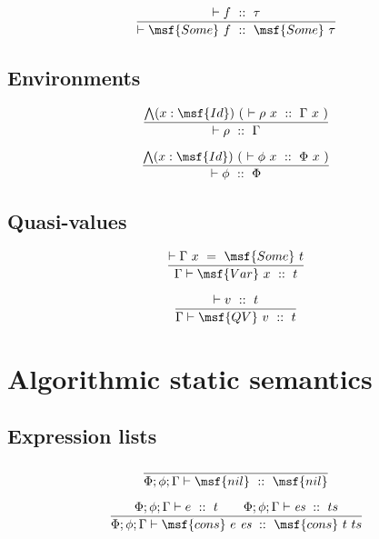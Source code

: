 \documentclass{article}
\begin{document}
\begin{gather}
\frac{ \vdash f \ :: \ \tau}
 { \vdash \msf{Some} \ f \ :: \ \msf{Some} \ \tau }
\end{gather}




\subsection{Environments}


\begin{gather}
  \frac{ \bigwedge ( x: \msf{Id} ) \ ( \ \vdash \rho \ x \ :: \ \Gamma
    \ x \ ) } { \vdash \rho \ :: \ \Gamma}
\end{gather}

\begin{gather}
  \frac{ \bigwedge ( x: \msf{Id} ) \ ( \ \vdash \phi \ x \ :: \ \Phi
    \ x \ ) } { \vdash \phi \ :: \ \Phi }
\end{gather}





\subsection{Quasi-values}

\begin{gather}
\frac{ \vdash \Gamma \ x \ = \ \msf{Some} \ t}{ \Gamma \vdash
  \msf{Var} \ x \ :: \ t}
\end{gather}

\begin{gather}
\frac{ \vdash v \ :: \ t}{ \Gamma \vdash \msf{QV} \ v \ :: \ t}
\end{gather}





\section{Algorithmic static semantics}



\subsection{Expression lists}

\begin{gather}
\frac{ } { \Phi; \phi; \Gamma \vdash \msf{nil} \ :: \ \msf{nil} }
\end{gather}


\begin{gather}
\frac{ \Phi; \phi; \Gamma \vdash e \ :: \ t \qquad \Phi; \phi; \Gamma
  \vdash \mbox{\it es} \ :: \ ts } { \Phi; \phi; \Gamma \vdash
  \msf{cons} \ e \ \mbox{\it es} \ :: \ \msf{cons} \ t \ ts }
\end{gather}
\end{document}
